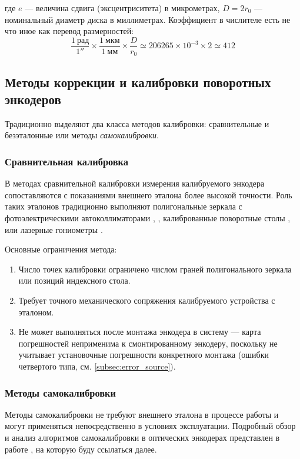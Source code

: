 где $e$ --- величина сдвига (эксцентриситета) в микрометрах, $D = 2r_0$ --- номинальный диаметр диска в миллиметрах. Коэффициент в числителе есть не что иное как перевод размерностей:
$$
\frac{1~\mathrm{рад}}{1''} \times \frac{1~\mathrm{мкм}}{1~\mathrm{мм}}\times\frac{D}{r_0}  \simeq 206265 \times 10^{-3}\times2 \simeq 412
$$

\subsection{Методы коррекции и калибровки поворотных энкодеров}

Традиционно выделяют два класса методов калибровки: сравнительные и безэталонные или методы \textit{самокалибровки}.

\subsubsection{Сравнительная калибровка}

В методах сравнительной калибровки измерения калибруемого энкодера сопоставляются с показаниями внешнего эталона более высокой точности. Роль таких эталонов традиционно выполняют полигональные зеркала с фотоэлектрическими автоколлиматорами \cite{24gon}, \cite{polygon}, калиброванные поворотные столы \cite{table}, \cite{table_guide} или лазерные гониометры \cite{gonio}.

Основные ограничения метода:
\begin{enumerate}
    \item Число точек калибровки ограничено числом граней полигонального зеркала или позиций индексного стола.
    \item Требует точного механического сопряжения калибруемого устройства с эталоном.
    \item Не может выполняться после монтажа энкодера в систему --- карта погрешностей неприменима к смонтированному энкодеру, поскольку не учитывает установочные погрешности конкретного монтажа (ошибки четвертого типа, см. \ref{subsec:error_source}).
\end{enumerate}

\subsubsection{Методы самокалибровки} \label{subsubsec:selfcal}

Методы самокалибровки не требуют внешнего эталона в процессе работы и могут применяться непосредственно в условиях эксплуатации. Подробный обзор и анализ алгоритмов самокалибровки
в оптических энкодерах представлен в работе \cite{kiryanov-overview}, на которую буду ссылаться далее.

